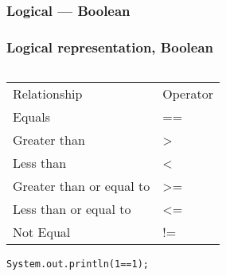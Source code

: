 \documentclass[en, 11pt, xcolor=dvipsnames]{beamer}
\begin{document}
\subsubsection{Logical --- Boolean}
\begin{frame}[fragile]
	\frametitle{Logical representation, Boolean}


	\begin{columns}[c]
		\begin{column}{0.9\textwidth}

			\begin{table}
				\begin{tabular}{l l}
					Relationship             & Operator \\
					Equals                   & ==       \\
					Greater than             & >        \\
					Less than                & <        \\
					Greater than or equal to & >=       \\
					Less than or equal to    & <=       \\
					Not Equal                & !=       \\
				\end{tabular}
			\end{table}

			\begin{lstlisting}[style=Java]
System.out.println(1==1);\end{lstlisting}

		\end{column}
	\end{columns}

\end{frame}
\end{document}
